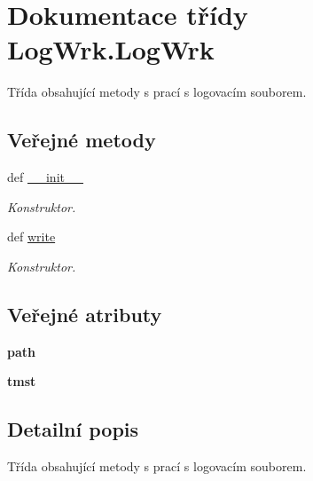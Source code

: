 \hypertarget{classLogWrk_1_1LogWrk}{\section{Dokumentace třídy Log\-Wrk.\-Log\-Wrk}
\label{d5/d2f/classLogWrk_1_1LogWrk}
}


Třída obsahující metody s prací s logovacím souborem.  


\subsection*{Veřejné metody}
\begin{DoxyCompactItemize}
\item 
def \hyperlink{classLogWrk_1_1LogWrk_a19fd0e1caa39a5a55cf5caab496481fe}{\-\_\-\-\_\-init\-\_\-\-\_\-}
\begin{DoxyCompactList}\small\item\em Konstruktor. \end{DoxyCompactList}\item 
def \hyperlink{classLogWrk_1_1LogWrk_ad3cc4159561b2cb00bd463b0e356e960}{write}
\begin{DoxyCompactList}\small\item\em Konstruktor. \end{DoxyCompactList}\end{DoxyCompactItemize}
\subsection*{Veřejné atributy}
\begin{DoxyCompactItemize}
\item 
\hypertarget{classLogWrk_1_1LogWrk_a1d465b6d28c5a9600a1b3f0bf7d69a9c}{{\bfseries path}}\label{d5/d2f/classLogWrk_1_1LogWrk_a1d465b6d28c5a9600a1b3f0bf7d69a9c}

\item 
\hypertarget{classLogWrk_1_1LogWrk_a1114de33a634db2dc9db89f922608494}{{\bfseries tmst}}\label{d5/d2f/classLogWrk_1_1LogWrk_a1114de33a634db2dc9db89f922608494}

\end{DoxyCompactItemize}


\subsection{Detailní popis}
Třída obsahující metody s prací s logovacím souborem. 

